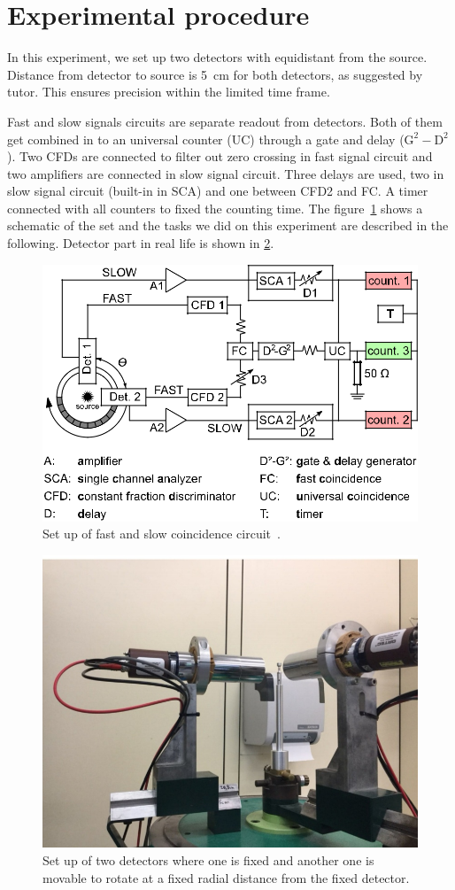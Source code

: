 \section{Experimental procedure}\label{sec:procedure}
In this experiment, we set up two detectors with equidistant from the source. Distance from detector to source is \SI{5}{\cm} for both detectors, as suggested by tutor. This ensures precision within the limited time frame.

Fast and slow signals circuits are separate readout from detectors. Both of them get combined in to an universal counter (UC) through a gate and delay ($\text{G}^{2}-\text{D}^{2}$). Two CFDs are connected to filter out zero crossing in fast signal circuit and two amplifiers are connected in slow signal circuit. Three delays are used, two in slow signal circuit (built-in in SCA) and one between CFD2 and FC. A timer connected with all counters to fixed the counting time. The figure~\ref{fig:CCuit} shows a schematic of the set and the tasks we did on this experiment are described in the following. Detector part in real life is shown in \ref{fig:detect}.
\begin{figure}[ht]
	\centering
	\includegraphics[width=0.7\linewidth]{./figs/CirCuit.png}
	\caption{Set up of fast and slow coincidence circuit~\cite{descr}.}%
	\label{fig:CCuit}
\end{figure}
\begin{figure}[ht]
	\centering
	\includegraphics[width=0.4\linewidth]{./figs/detectors.jpg}
	\caption{Set up of two detectors where one is fixed and another one is movable to rotate at a fixed radial distance from the fixed detector.}%
	\label{fig:detect}
\end{figure}

